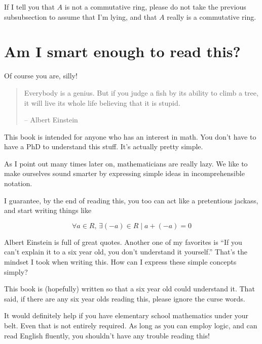 If I tell you that $A$ is not a commutative ring, please do not take the
previous subsubsection to assume that I'm lying, and that $A$ really is a
commutative ring.
\section{Am I smart enough to read this?}

Of course you are, silly! 

\begin{quotation}
  Everybody is a genius. But if you judge a fish by its ability to climb a tree,
  it will live its whole life believing that it is stupid.
  
  -- Albert Einstein
\end{quotation}

This book is intended for anyone who has an interest in math. You don't have to
have a PhD to understand this stuff. It's actually pretty simple.

As I point out many times later on, mathematicians are really lazy. We like to
make ourselves sound smarter by expressing simple ideas in incomprehensible
notation.

I guarantee, by the end of reading this, you too can act like a pretentious
jackass, and start writing things like

$$\forall a \in R,\, \exists (-a) \in R \mid a + (-a) = 0$$

Albert Einstein is full of great quotes. Another one of my favorites is ``If you
can't explain it to a six year old, you don't understand it yourself.'' That's
the mindset I took when writing this. How can I express these simple concepts
simply?

This book is (hopefully) written so that a six year old could understand
it. That said, if there are any six year olds reading this, please ignore the
curse words.

It would definitely help if you have elementary school mathematics under your
belt. Even that is not entirely required. As long as you can employ logic, and
can read English fluently, you shouldn't have any trouble reading this!


